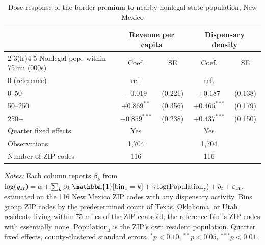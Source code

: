 \begin{table}[htbp]
\centering
\caption{Dose-response of the border premium to nearby nonlegal-state population, New Mexico}
\label{tab:nm_nonlegalpop_doseresponse}
\footnotesize
\begin{tabular}{lcccc}
\toprule
 & \multicolumn{2}{c}{Revenue per capita} & \multicolumn{2}{c}{Dispensary density} \\
\cmidrule(lr){2-3}\cmidrule(lr){4-5}
Nonlegal pop.\ within 75 mi (000s) & Coef. & SE & Coef. & SE \\
\midrule
0 (reference) & ref. & & ref. & \\
0--50 & $-0.019$ & (0.221) & $+0.187$ & (0.138) \\
50--250 & $+0.869^{**}$ & (0.356) & $+0.465^{***}$ & (0.179) \\
250+ & $+0.859^{***}$ & (0.238) & $+0.437^{***}$ & (0.150) \\
\midrule
Quarter fixed effects & Yes & & Yes & \\
Observations & 1,704 & & 1,704 & \\
Number of ZIP codes & 116 & & 116 & \\
\bottomrule
\end{tabular}
\begin{minipage}{0.92\textwidth}
\vspace{0.4em}\footnotesize
\textit{Notes:} Each column reports $\beta_k$ from $\log(y_{zt}) = \alpha + \sum_k \beta_k\,\mathbbm{1}[\text{bin}_z=k] + \gamma\log(\text{Population}_z) + \delta_t + \varepsilon_{zt}$, estimated on the 116 New Mexico ZIP codes with any dispensary activity. Bins group ZIP codes by the predetermined count of Texas, Oklahoma, or Utah residents living within 75 miles of the ZIP centroid; the reference bin is ZIP codes with essentially none. $\text{Population}_z$ is the ZIP's own resident population. Quarter fixed effects, county-clustered standard errors. $^{*}p<0.10$, $^{**}p<0.05$, $^{***}p<0.01$.
\end{minipage}
\end{table}
